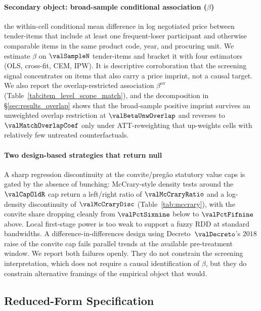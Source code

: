 \paragraph{Secondary object: broad-sample conditional association \texorpdfstring{($\beta$)}{(beta)}} the
within-cell conditional mean difference in log negotiated price
between tender-items that include at least one frequent-loser
participant and otherwise comparable items in the same product
code, year, and procuring unit. We estimate $\beta$ on
$\valSampleN$ tender-items and bracket it with four estimators
(OLS, cross-fit, CEM, IPW). It is descriptive corroboration that
the screening signal concentrates on items that also carry a
price imprint, not a causal target. We also report the
overlap-restricted association $\beta^{\text{ov}}$
(Table~\ref{tab:item_level_scope_match}), and the decomposition in
\S\ref{sec:results_overlap} shows that the broad-sample positive
imprint survives an unweighted overlap restriction at
$\valBetaUnwOverlap$ and reverses to $\valMatchOverlapCoef$ only
under ATT-reweighting that up-weights cells with relatively few
untreated counterfactuals.

\paragraph{Two design-based strategies that return null}
A sharp regression discontinuity at the convite/preg\~ao
statutory value caps is gated by the absence of bunching:
McCrary-style density tests around the $\valCapOldR$ cap return
a left/right ratio of $\valMcCraryRatio$ and a log-density
discontinuity of $\valMcCraryDisc$
(Table~\ref{tab:mccrary}), with the convite share dropping
cleanly from $\valPctSixnine$ below to $\valPctFifnine$ above.
Local first-stage power is too weak to support a fuzzy RDD at
standard bandwidths. A difference-in-differences design using
Decreto~$\valDecreto$'s $2018$ raise of the convite cap fails
parallel trends at the available pre-treatment window. We
report both failures openly. They do not constrain the
screening interpretation, which does not require a causal
identification of $\beta$, but they do constrain alternative
framings of the empirical object that would.

\subsection{Reduced-Form Specification}
\label{sec:emp_reduced}

